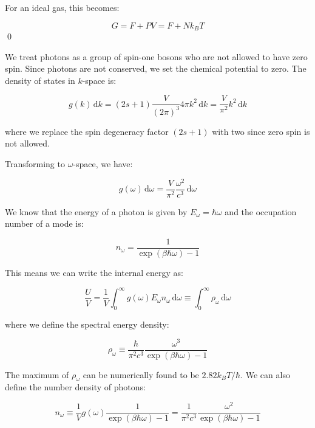 \documentclass[12pt]{article}
\begin{document}
For an ideal gas, this becomes:

\begin{equation}
    G = F + PV = F + Nk_{B}T
\end{equation}
\qed


We treat photons as a group of spin-one bosons who are not allowed to have zero spin. Since photons are not conserved, we set the chemical potential to zero. The density of states in $k$-space is:

\begin{equation}
    g(k) \, \mathrm{d}k = (2s + 1) \frac{V}{(2\pi)^{3}} 4\pi k^{2} \, \mathrm{d}k = \frac{V}{\pi^{2}} k^{2} \, \mathrm{d}k
\end{equation}

where we replace the spin degeneracy factor $(2s + 1)$ with two since zero spin is not allowed.

Transforming to $\omega$-space, we have:

\begin{equation}
    g(\omega) \, \mathrm{d}\omega = \frac{V}{\pi^{2}} \frac{\omega^{2}}{c^{3}} \, \mathrm{d}\omega
\end{equation}

We know that the energy of a photon is given by $E_{\omega} = \hbar \omega$ and the occupation number of a mode is:

\begin{equation}
    n_{\omega} = \frac{1}{\exp\left( \beta \hbar \omega \right) - 1}
\end{equation}

This means we can write the internal energy as:

\begin{equation}
    \frac{U}{V} = \frac{1}{V} \int_{0}^{\infty} g(\omega) E_{\omega} n_{\omega} \, \mathrm{d}\omega \equiv \int_{0}^{\infty} \rho_{\omega} \, \mathrm{d}\omega
\end{equation}

where we define the spectral energy density:

\begin{equation}
    \rho_{\omega} \equiv \frac{\hbar}{\pi^{2}c^{3}} \frac{\omega^{3}}{\exp\left( \beta \hbar \omega \right) - 1}
\end{equation}

The maximum of $\rho_{\omega}$ can be numerically found to be $2.82 k_{B}T/\hbar$. We can also define the number density of photons:

\begin{equation}
    n_{\omega} \equiv \frac{1}{V} g(\omega) \frac{1}{\exp\left( \beta \hbar \omega \right) - 1} = \frac{1}{\pi^{2}c^{3}} \frac{\omega^{2}}{\exp\left( \beta \hbar \omega \right) - 1}
\end{equation}
\end{document}
